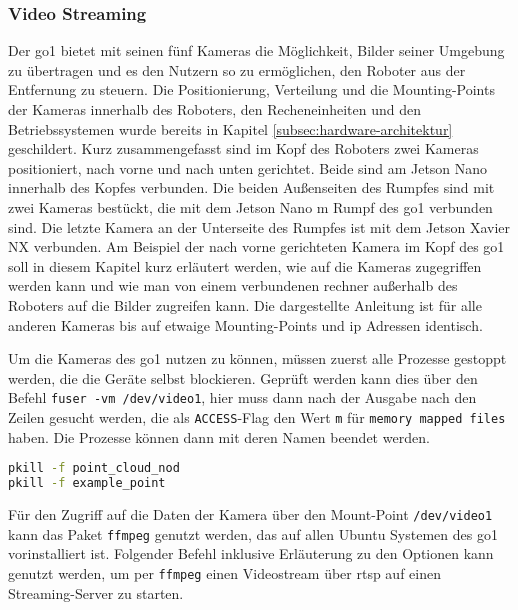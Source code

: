 \subsubsection{Video Streaming}
\label{subsubsec:video-streaming}

Der \gls{go1} bietet mit seinen fünf Kameras die Möglichkeit, Bilder seiner Umgebung zu übertragen und es den Nutzern so
zu ermöglichen, den Roboter aus der Entfernung zu steuern.
Die Positionierung, Verteilung und die Mounting-Points der Kameras innerhalb des Roboters, den Recheneinheiten und den
Betriebssystemen wurde bereits in Kapitel \ref{subsec:hardware-architektur} geschildert.
Kurz zusammengefasst sind im Kopf des Roboters zwei Kameras positioniert, nach vorne und nach unten gerichtet.
Beide sind am Jetson Nano innerhalb des Kopfes verbunden.
Die beiden Außenseiten des Rumpfes sind mit zwei Kameras bestückt, die mit dem Jetson Nano m Rumpf des \gls{go1} verbunden sind.
Die letzte Kamera an der Unterseite des Rumpfes ist mit dem Jetson Xavier NX verbunden.
Am Beispiel der nach vorne gerichteten Kamera im Kopf des \gls{go1} soll in diesem Kapitel kurz erläutert werden,
wie auf die Kameras zugegriffen werden kann und wie man von einem verbundenen rechner außerhalb des Roboters auf die Bilder
zugreifen kann.
Die dargestellte Anleitung ist für alle anderen Kameras bis auf etwaige Mounting-Points und \gls{ip} Adressen identisch.


Um die Kameras des \gls{go1} nutzen zu können, müssen zuerst alle Prozesse gestoppt werden, die die Geräte selbst blockieren.
Geprüft werden kann dies über den Befehl \texttt{fuser -vm /dev/\allowbreak video1}, hier muss dann nach der Ausgabe nach den Zeilen gesucht werden,
die als \texttt{ACCESS}-Flag den Wert \texttt{m} für \texttt{memory mapped files} haben.
Die Prozesse können dann mit deren Namen beendet werden.

\begin{lstlisting}[language=Bash]
pkill -f point_cloud_nod
pkill -f example_point
\end{lstlisting}

Für den Zugriff auf die Daten der Kamera über den Mount-Point \texttt{/dev/\allowbreak video1} kann das Paket \texttt{ffmpeg}
genutzt werden, das auf allen Ubuntu Systemen des \gls{go1} vorinstalliert ist.
Folgender Befehl inklusive Erläuterung zu den Optionen kann genutzt werden, um per \texttt{ffmpeg} einen Videostream
über \gls{rtsp} auf einen Streaming-Server zu starten.

